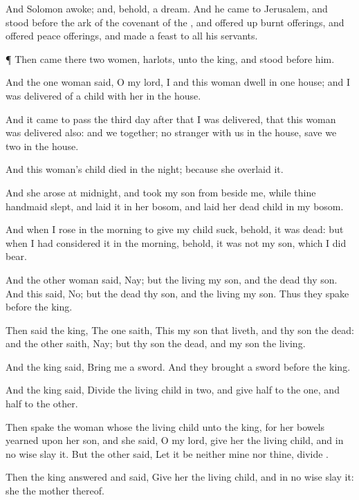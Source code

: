 {And
Solomon
awoke; and, behold,
{} a
dream. And he
came to
Jerusalem, and
stood
before the
ark of the
covenant of the
{}, and offered
up burnt
offerings, and
offered peace
offerings, and
made a
feast to all his
servants.


\par }{\PP {}¶ Then
came there
two
women,
{}
harlots, unto the
king, and
stood
before him.

And the
one
woman
said,
O my
lord, I and this
woman
dwell in
one
house; and I was delivered of a
child with her in the
house.

And it came to pass the
third
day after that I was
delivered, that this
woman was
delivered also: and we
{}
together;
{} no
stranger with us in the
house,
save we
two in the
house.

And this
woman’s
child
died in the
night; because she
overlaid it.

And she
arose at
midnight, and
took my
son from
beside me, while thine
handmaid
slept, and
laid it in her
bosom, and
laid her
dead
child in my
bosom.

And when I
rose in the
morning to give my
child
suck, behold, it was
dead: but when I had
considered it in the
morning, behold, it was not my
son, which I did
bear.

And the
other
woman
said, Nay; but the
living
{} my
son, and the
dead
{} thy
son. And this
said, No; but the
dead
{} thy
son, and the
living
{} my
son. Thus they
spake
before the
king.

Then
said the
king, The
one
saith, This
{} my
son that
liveth, and thy
son
{} the
dead: and the
other
saith, Nay; but thy
son
{} the
dead, and my
son
{} the
living.

And the
king
said,
Bring me a
sword. And they
brought a
sword
before the
king.

And the
king
said,
Divide the
living
child in
two, and
give
half to the
one, and
half to the
other.

Then
spake the
woman whose the
living
child
{} unto the
king, for her
bowels
yearned upon her
son, and she
said,
O my
lord,
give her the
living
child, and in no
wise
slay it. But the other
said, Let it be neither mine nor thine,
{}
divide
{}.

Then the
king
answered and
said,
Give her the
living
child, and in no
wise
slay it: she
{} the
mother thereof.

}
